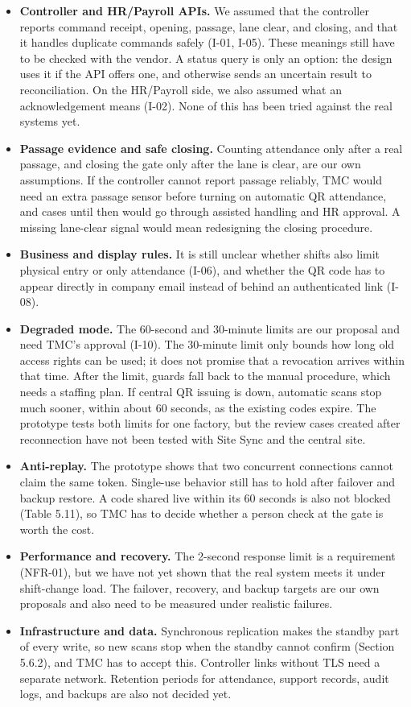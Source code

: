 \begin{itemize}[leftmargin=36pt, itemsep=2pt, topsep=4pt, parsep=2pt]
  \item \textbf{Controller and HR/Payroll APIs.} We assumed that the controller reports command receipt, opening, passage, lane clear, and closing, and that it handles duplicate commands safely (I-01, I-05). These meanings still have to be checked with the vendor. A status query is only an option: the design uses it if the API offers one, and otherwise sends an uncertain result to reconciliation. On the HR/Payroll side, we also assumed what an acknowledgement means (I-02). None of this has been tried against the real systems yet.
  \item \textbf{Passage evidence and safe closing.} Counting attendance only after a real passage, and closing the gate only after the lane is clear, are our own assumptions. If the controller cannot report passage reliably, TMC would need an extra passage sensor before turning on automatic QR attendance, and cases until then would go through assisted handling and HR approval. A missing lane-clear signal would mean redesigning the closing procedure.
  \item \textbf{Business and display rules.} It is still unclear whether shifts also limit physical entry or only attendance (I-06), and whether the QR code has to appear directly in company email instead of behind an authenticated link (I-08).
  \item \textbf{Degraded mode.} The 60-second and 30-minute limits are our proposal and need TMC's approval (I-10). The 30-minute limit only bounds how long old access rights can be used; it does not promise that a revocation arrives within that time. After the limit, guards fall back to the manual procedure, which needs a staffing plan. If central QR issuing is down, automatic scans stop much sooner, within about 60 seconds, as the existing codes expire. The prototype tests both limits for one factory, but the review cases created after reconnection have not been tested with Site Sync and the central site.
  \item \textbf{Anti-replay.} The prototype shows that two concurrent connections cannot claim the same token. Single-use behavior still has to hold after failover and backup restore. A code shared live within its 60 seconds is also not blocked (Table 5.11), so TMC has to decide whether a person check at the gate is worth the cost.
  \item \textbf{Performance and recovery.} The 2-second response limit is a requirement (NFR-01), but we have not yet shown that the real system meets it under shift-change load. The failover, recovery, and backup targets are our own proposals and also need to be measured under realistic failures.
  \item \textbf{Infrastructure and data.} Synchronous replication makes the standby part of every write, so new scans stop when the standby cannot confirm (Section 5.6.2), and TMC has to accept this. Controller links without TLS need a separate network. Retention periods for attendance, support records, audit logs, and backups are also not decided yet.
\end{itemize}

